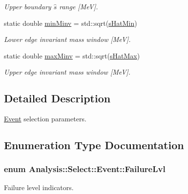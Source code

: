 \begin{DoxyCompactItemize}
\begin{DoxyCompactList}\small\item\em Upper boundary $ \hat{s} $ range \mbox{[}MeV\mbox{]}. \end{DoxyCompactList}\item 
static double \hyperlink{namespaceAnalysis_1_1Select_1_1Event_aad3b80c550b598d2523d76c1819f69fc}{min\+Minv} = std\+::sqrt(\hyperlink{namespaceAnalysis_1_1Select_1_1Event_afc8b09ec51a480d59ceb969a6e984788}{s\+Hat\+Min})
\begin{DoxyCompactList}\small\item\em Lower edge invariant mass window \mbox{[}MeV\mbox{]}. \end{DoxyCompactList}\item 
static double \hyperlink{namespaceAnalysis_1_1Select_1_1Event_ac8ebe80d80c112512ad10d3092e21fb1}{max\+Minv} = std\+::sqrt(\hyperlink{namespaceAnalysis_1_1Select_1_1Event_a5a398a3f4f0590598003266da5bb6d9f}{s\+Hat\+Max})
\begin{DoxyCompactList}\small\item\em Upper edge invariant mass window \mbox{[}MeV\mbox{]}. \end{DoxyCompactList}\end{DoxyCompactItemize}


\subsection{Detailed Description}
\hyperlink{namespaceAnalysis_1_1Select_1_1Event}{Event} selection parameters. 

\subsection{Enumeration Type Documentation}
\subsubsection[{\texorpdfstring{Failure\+Lvl}{FailureLvl}}]{\setlength{\rightskip}{0pt plus 5cm}enum {\bf Analysis\+::\+Select\+::\+Event\+::\+Failure\+Lvl}}\hypertarget{namespaceAnalysis_1_1Select_1_1Event_a52c4d90d5d3ef88d9ca5c6a16798cbdb}{}\label{namespaceAnalysis_1_1Select_1_1Event_a52c4d90d5d3ef88d9ca5c6a16798cbdb}


Failure level indicators. 

